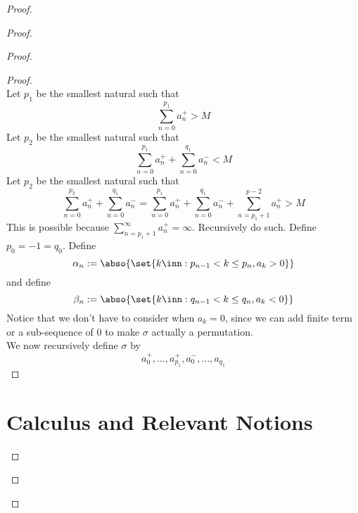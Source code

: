 \documentclass{report}
\begin{document}
\begin{proof}
\begin{proof}
\begin{proof}
\begin{proof}
\begin{equation*}
\end{equation*}
Let $p_1$ be the smallest natural such that 
 \begin{equation*}
\sum_{n=0}^{p_1} a_n^+>M
\end{equation*}
Let $p_2$ be the smallest natural such that 
 \begin{equation*}
\sum_{n=0}^{p_1}a_n^+ +\sum _{n=0}^{q_1}a_n^- <M
\end{equation*}
Let $p_2$ be the smallest natural such that 
 \begin{equation*}
\sum_{n=0}^{p_2} a_n^+ + \sum_{n=0}^{q_1} a_n^- =\sum_{n=0}^{p_1} a_n^+ + \sum_{n=0}^{q_1} a_n^- +\sum_{n=p_1+1}^{p-2} a_n^+ >M 
\end{equation*}
This is possible because $\sum_{n=p_1+1}^{\infty}a_n^+=\infty$. Recursively do such. Define $p_0=-1=q_0$.  Define 
\begin{equation*}
\alpha_n:=\abso{\set{k\inn: p_{n-1}<k\leq p_n,a_k> 0}}
\end{equation*}
and define 
\begin{equation*}
\beta _n:=\abso{\set{k\inn: q_{n-1}<k\leq q_n,a_k<0}}
\end{equation*}
Notice that we don't have to consider when $a_k=0$, since we can add finite term or a sub-sequence of $0$ to make  $\sigma$ actually a permutation.\\

We now recursively define $\sigma$ by 
\begin{equation*}
  a_0^+,\dots ,a_{p_1}^+, a_{0}^-,\dots ,a_{q_1}
\end{equation*}


\end{proof}

\chapter{Calculus and Relevant Notions}

\end{proof}
\end{proof}
\end{proof}
\end{document}
